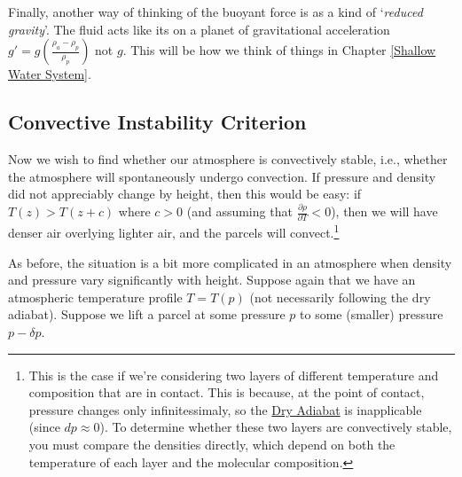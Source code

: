 Finally, another way of thinking of the buoyant force is as a kind of `\textit{reduced gravity}'. The fluid acts like its on a planet of gravitational acceleration $g'=g\left( \frac{\rho_a-\rho_p}{\rho_p} \right)$ not $g$. This will be how we think of things in Chapter \ref{Shallow Water System}. 

\subsection{Convective Instability Criterion}

Now we wish to find whether our atmosphere is convectively stable, i.e., whether the atmosphere will spontaneously undergo convection. If pressure and density did not appreciably change by height, then this would be easy: if $T(z)>T(z+c)$ where $c>0$ (and assuming that $\frac{\partial \rho}{\partial T}<0$), then we will have denser air overlying lighter air, and the parcels will convect.\footnote{
    This is the case if we're considering two layers of different temperature and composition that are in contact. This is because, at the point of contact, pressure changes only infinitessimaly, so the \hyperref[Dry Adiabat]{Dry Adiabat} is inapplicable (since $dp\approx0$). To determine whether these two layers are convectively stable, you must compare the densities directly, which depend on both the temperature of each layer and the molecular composition.
}

As before, the situation is a bit more complicated in an atmosphere when density and pressure vary significantly with height. Suppose again that we have an atmospheric temperature profile $T=T(p)$ (not necessarily following the dry adiabat). Suppose we lift a parcel at some pressure $p$ to some (smaller) pressure $p-\delta p$.

